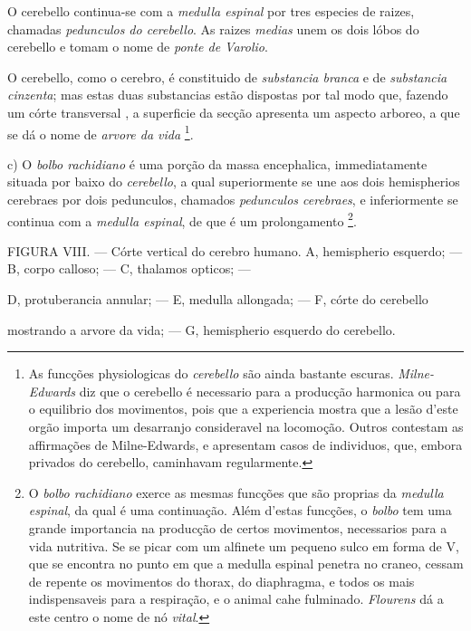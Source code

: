 O cerebello continua-se com a \emph{medulla espinal} por tres especies de raizes, chamadas \emph{pedunculos do cerebello}. As raizes \emph{medias} unem os dois lóbos do cerebello e tomam o nome de \emph{ponte de Varolio}.

O cerebello, como o cerebro, é constituido de \emph{substancia branca} e de \emph{substancia cinzenta}; mas estas duas substancias estão dispostas por tal modo que, fazendo um córte transversal  , a superficie da secção apresenta um aspecto arboreo, a que se dá o nome de \emph{arvore da vida} \footnote{As funcções physiologicas do \emph{cerebello} são ainda bastante escuras. \emph{Milne-Edwards} diz que o cerebello é necessario para a producção harmonica ou para o equilibrio dos movimentos, pois que a experiencia mostra que a lesão d'este orgão importa um desarranjo consideravel na locomoção. Outros contestam as affirmações de Milne-Edwards, e apresentam casos de individuos, que, embora privados do cerebello, caminhavam regularmente.}.

c) O \emph{bolbo rachidiano} é uma porção da massa encephalica, immediatamente situada por baixo do \emph{cerebello}, a qual superiormente se une aos dois hemispherios cerebraes por dois pedunculos, chamados \emph{pedunculos cerebraes}, e inferiormente se continua com a \emph{medulla espinal}, de que é um prolongamento \footnote{O \emph{bolbo rachidiano} exerce as mesmas funcções que são proprias da \emph{medulla espinal}, da qual é uma continuação. Além d'estas funcções, o \emph{bolbo} tem uma grande importancia na producção de certos movimentos, necessarios para a vida nutritiva. Se se picar com um alfinete um pequeno sulco em forma de V, que se encontra no punto em que a medulla espinal penetra no craneo, cessam de repente os movimentos do thorax, do diaphragma, e todos os mais indispensaveis para a respiração, e o animal cahe fulminado. \emph{Flourens} dá a este centro o nome de nó \emph{vital}.}.

FIGURA VIII. --- Córte vertical do cerebro humano. A, hemispherio esquerdo; --- B, corpo calloso; --- C, thalamos opticos; ---

D, protuberancia annular; --- E, medulla allongada; --- F, córte do cerebello

mostrando a arvore da vida; --- G, hemispherio esquerdo do cerebello.

